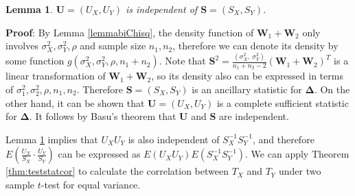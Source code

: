 \documentclass[12pt, a4paper]{article}
\newtheorem{lemma}{Lemma}
\begin{document}
	\begin{lemma}\label{lemmaIndep}
		$\bm U =(U_X, U_Y)$ is independent of $\bm S = (S_X ,S_Y)$.
	\end{lemma}
	\textbf{Proof}: By Lemma \ref{lemmabiChisq}, the density function of $
	\bm W_1 + \bm W_2$ only involves $\sigma^2_X, \sigma^2_Y, \rho$ and sample size $n_1, n_2$, therefore
	we can denote its density by some function $g(\sigma^2_X, \sigma^2_Y, \rho,
	n_1 + n_2)$. Note that $\bm S^2 = \frac{(\sigma_X^2, ~\sigma^2_Y)}{n_1 +n_2 -2}(\bm W_1 + \bm W_2)^T $
	is a linear transformation of $\bm W_1 + \bm W_2$, so its density also can be expressed in terms of $\sigma^2_1, \sigma^2_2, \rho, n_1, n_2$. Therefore $\bm S = (S_X ,S_Y)$ is an ancillary statistic for $\bm \Delta$. On the other hand, it can
	be shown that $\bm U =(U_X, U_Y)$ is a complete sufficient statistic for $\bm \Delta$. It follows by
	Basu's theorem that $\bm U$ and $\bm S$ are independent. 
	
	
	Lemma \ref{lemmaIndep} implies that  $U_XU_Y$ is also independent of $S_X^{-1}S_Y^{-1}$, and
	therefore $E(\frac{U_X}{S_X} \cdot\frac{U_Y}{S_Y})$ can be expressed as
	$E(U_XU_Y)E(S_X^{-1}S_Y^{-1})$. We can apply Theorem \ref{thm:teststatcor} to calculate the correlation between $T_X$ and $T_Y$ under two sample $t$-test for equal variance. 
	
\end{document}
